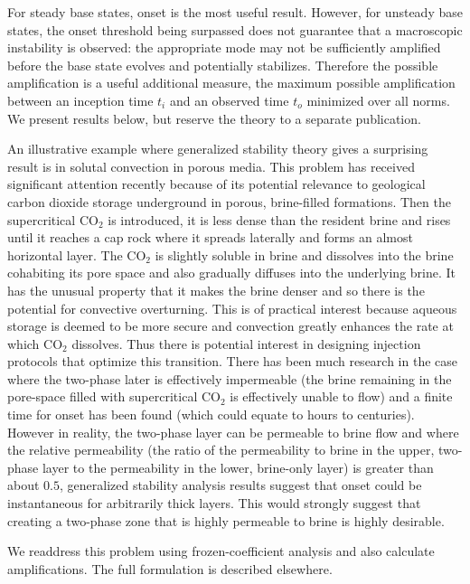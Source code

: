 \documentclass[letterpaper,prl,aps,preprint,superscriptaddress]{revtex4-1}
\newcommand{\COtwo}[1]{CO$_2$ }
\begin{document}
For steady base states, onset is the most useful result.  However, for unsteady base states, the onset threshold being surpassed does not guarantee that a macroscopic instability is observed: the appropriate mode may not be sufficiently amplified before the base state evolves and potentially stabilizes.  Therefore the possible amplification is a useful additional measure, the maximum possible amplification between an inception time $t_i$ and an observed time $t_o$ minimized over all norms.  We present results below, but reserve the theory to a separate publication.

An illustrative example where generalized stability theory gives a surprising result is in solutal convection in porous media.  This problem has received significant attention recently because of its potential relevance to geological carbon dioxide storage underground in porous, brine-filled formations.  Then the supercritical \COtwo{} is introduced, it is less dense than the resident brine and rises until it reaches a cap rock where it spreads laterally and forms an almost horizontal layer.  The \COtwo{} is slightly soluble in brine and dissolves into the brine cohabiting its pore space and also gradually diffuses into the underlying brine.  It has the unusual property that it makes the brine denser and so there is the potential for convective overturning.  This is of practical interest because aqueous storage is deemed to be more secure and convection greatly enhances the rate at which \COtwo{} dissolves.  Thus there is potential interest in designing injection protocols that optimize this transition.  There has been much research in the case where the two-phase later is effectively impermeable (the brine remaining in the pore-space filled with supercritical \COtwo{} is effectively unable to flow) and a finite time for onset has been found (which could equate to hours to centuries).  However in reality, the two-phase layer can be permeable to brine flow and where the relative permeability (the ratio of the permeability to brine in the upper, two-phase layer to the permeability in the lower, brine-only layer) is greater than about $0.5$, generalized stability analysis results suggest that onset could be instantaneous for arbitrarily thick layers.  This would strongly suggest that creating a two-phase zone that is highly permeable to brine is highly desirable.  

We readdress this problem using frozen-coefficient analysis and also calculate amplifications.  The full formulation is described elsewhere.
\end{document}
